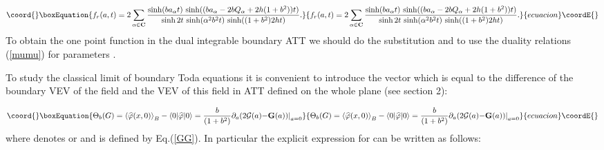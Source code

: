 \documentclass[a4paper,12pt,titlepage,final]{article}
\begin{document}
\begin{equation}\coord{}\boxEquation{
f_{r}(a,t)=2\sum_{\alpha \in \mathbf{C}}\frac{\sinh (ba_{\alpha }t)\,\sinh
((ba_{\alpha }-2bQ_{\alpha }+2h(1+b^{2}))t)}{\sinh 2t\,\sinh (\alpha
^{2}b^{2}t)\,\sinh ((1+b^{2})2ht)}.  \label{f2}
}{
f_{r}(a,t)=2\sum_{\alpha \in \mathbf{C}}\frac{\sinh (ba_{\alpha }t)\,\sinh
((ba_{\alpha }-2bQ_{\alpha }+2h(1+b^{2}))t)}{\sinh 2t\,\sinh (\alpha
^{2}b^{2}t)\,\sinh ((1+b^{2})2ht)}.  }{ecuacion}\coordE{}\end{equation}
To obtain the one point function in the dual integrable boundary
\coordHE{} ATT we should do the
substitution \coordHE{} and to
use the duality relations (\ref{mumu}) for parameters \coordHE{}.

To study the classical limit of boundary Toda equations it is convenient to
introduce the vector \coordHE{} which is equal to the difference of the
boundary VEV of the field \coordHE{} and the
VEV of this field in ATT defined on the whole plane (see section 2):

\begin{equation}\coord{}\boxEquation{
\Theta _{b}(G)=\left\langle \widehat{\varphi }(x,0)\right\rangle
_{B}-\left\langle 0|\widehat{\varphi }|0\right\rangle =\frac{b}{(1+b^{2})}
\partial _{a}(2\mathcal{G}(a)\mathcal{-}\mathbf{G(}a\mathbf{))|}_{a=0}
\label{th}
}{
\Theta _{b}(G)=\left\langle \widehat{\varphi }(x,0)\right\rangle
_{B}-\left\langle 0|\widehat{\varphi }|0\right\rangle =\frac{b}{(1+b^{2})}
\partial _{a}(2\mathcal{G}(a)\mathcal{-}\mathbf{G(}a\mathbf{))|}_{a=0}
}{ecuacion}\coordE{}\end{equation}
where \coordHE{} denotes \coordHE{} or \coordHE{} and
\coordHE{} is defined by Eq.(\ref{GG}). In particular the explicit
expression for \coordHE{} can be written as follows:
\end{document}
